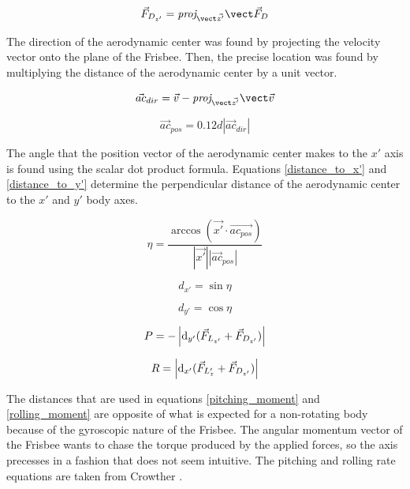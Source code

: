 \documentclass[12pt,twoside,letterpaper]{article}
\begin{document}
\begin{multicols}{2}
\begin{equation}
    \vec{F}_{D_{z'}} =\vectorproj[\vec{z'}]{\vec{F}_D}
    \label{body_axis_drag}
\end{equation}

\par
The direction of the aerodynamic center was found by projecting the velocity vector onto the plane of the Frisbee. Then, the precise location was found by multiplying the distance of the aerodynamic center by a unit vector. 

\begin{equation}
    \vec{ac}_{dir} = \vec{v} - \vectorproj[\vec{z'}]{\vec{v}}
    \label{ac_direction_vector}
\end{equation}

\begin{equation}
    \vec{ac}_{pos} = 0.12d \left|\vec{ac}_{dir}\right| 
    \label{ac_position_vector}
\end{equation}

The angle that the position vector of the aerodynamic center makes to the $x'$ axis is found using the scalar dot product formula. Equations \eqref{distance_to_x'} and \eqref{distance_to_y'} determine the perpendicular distance of the aerodynamic center to the $x'$ and $y'$ body axes.

\begin{equation}
    \eta = \frac{\arccos({\vec{x'} \cdot \vec{ac_{pos}}})}{\left|\vec{x'}\right| \left|\vec{ac}_{pos}\right|}
    \label{x'_angle}
\end{equation}

\begin{equation}
    d_{x'} = \sin{\eta} 
    \label{distance_to_x'}
\end{equation}

\begin{equation}
    d_{y'} = \cos{\eta} 
    \label{distance_to_y'}
\end{equation}

\begin{equation}
    P = -\left| \mathrm{d}_{y'}(\vec{F}_{L_{z'}} +  \vec{F}_{D_{z'}}) \right|
    \label{pitching_moment}
\end{equation}

\begin{equation}
    R = \left| \mathrm{d}_{x'}(\vec{F}_{L_z'} +  \vec{F}_{D_{z'}}) \right|
    \label{rolling_moment}
\end{equation}

The distances that are used in equations \eqref{pitching_moment} and \eqref{rolling_moment} are opposite of what is expected for a non-rotating body because of the gyroscopic nature of the Frisbee. The angular momentum vector of the Frisbee wants to chase the torque produced by the applied forces, so the axis precesses in a fashion that does not seem intuitive. The pitching and rolling rate equations are taken from Crowther \cite{Crowther2007}.  


\end{multicols}
\end{document}

